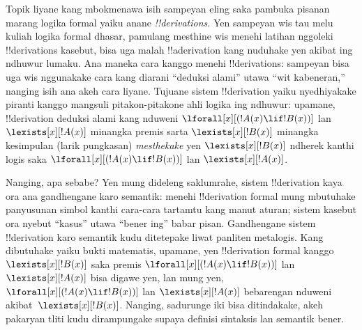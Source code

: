 \documentclass[../../../include/open-logic-section]{subfiles}
\begin{document}
Topik liyane kang mbokmenawa isih sampeyan eling saka pambuka pisanan
marang logika formal yaiku anane \emph{!!{derivation}s}. Yen sampeyan
wis tau melu kuliah logika formal dhasar, pamulang mesthine wis menehi
latihan nggoleki !!{derivation}s kasebut, bisa uga malah !!a{derivation}
kang nuduhake yen akibat ing ndhuwur lumaku. Ana maneka cara kanggo
menehi !!{derivation}s: sampeyan bisa uga wis nggunakake cara kang
diarani ``deduksi alami'' utawa ``wit kabeneran,'' nanging isih ana
akeh cara liyane. Tujuane sistem !!{derivation} yaiku nyedhiyakake
piranti kanggo mangsuli pitakon-pitakone ahli logika ing ndhuwur:
upamane, !!{derivation} deduksi alami kang nduweni
$\lforall[x][(!A(x) \lif !B(x))]$ lan $\lexists[x][!A(x)]$ minangka
premis sarta $\lexists[x][!B(x)]$ minangka kesimpulan (larik pungkasan)
\emph{mesthekake} yen $\lexists[x][!B(x)]$ ndherek kanthi logis saka
$\lforall[x][(!A(x) \lif !B(x))]$ lan $\lexists[x][!A(x)]$.

Nanging, apa sebabe? Yen mung dideleng saklumrahe, sistem
!!{derivation} kaya ora ana gandhengane karo semantik: menehi
!!{derivation} formal mung mbutuhake panyusunan simbol kanthi cara-cara
tartamtu kang manut aturan; sistem kasebut ora nyebut ``kasus'' utawa
``bener ing'' babar pisan. Gandhengane sistem !!{derivation} karo
semantik kudu ditetepake liwat panliten metalogis. Kang dibutuhake yaiku
bukti matematis, upamane, yen !!{derivation} formal kanggo
$\lexists[x][!B(x)]$ saka premis $\lforall[x][(!A(x) \lif !B(x))]$ lan
$\lexists[x][!A(x)]$ bisa digawe yen, lan mung yen,
$\lforall[x][(!A(x) \lif !B(x))]$ lan $\lexists[x][!A(x)]$ bebarengan
nduweni akibat~$\lexists[x][!B(x)]$. Nanging, sadurunge iki
bisa ditindakake, akeh pakaryan tliti kudu dirampungake supaya definisi
sintaksis lan semantik bener.
\end{document}
